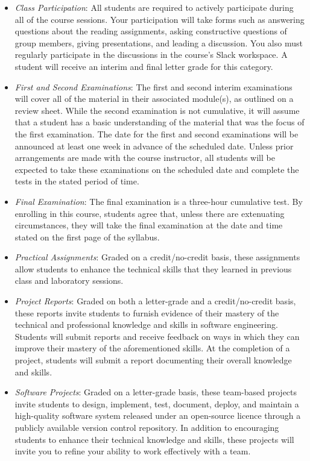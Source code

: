 \documentclass[11pt]{article}
\begin{document}
\begin{itemize}

  \item {\em Class Participation\/}: All students are required to actively
    participate during all of the course sessions. Your participation will take
    forms such as answering questions about the reading assignments, asking
    constructive questions of group members, giving presentations, and leading a
    discussion. You also must regularly participate in the discussions in the
    course's Slack workspace. A student will receive an interim and final letter
    grade for this category.

  \item {\em First and Second Examinations\/}: The first and second interim
    examinations will cover all of the material in their associated module(s),
    as outlined on a review sheet. While the second examination is not
    cumulative, it will assume that a student has a basic understanding of the
    material that was the focus of the first examination. The date for the first
    and second examinations will be announced at least one week in advance of
    the scheduled date. Unless prior arrangements are made with the course
    instructor, all students will be expected to take these examinations on the
    scheduled date and complete the tests in the stated period of time.

  \item {\em Final Examination\/}: The final examination is a three-hour
    cumulative test. By enrolling in this course, students agree that, unless
    there are extenuating circumstances, they will take the final examination at
    the date and time stated on the first page of the syllabus.

  \item {\em Practical Assignments\/}: Graded on a credit/no-credit basis, these
    assignments allow students to enhance the technical skills that they learned
    in previous class and laboratory sessions.

  \item {\em Project Reports\/}: Graded on both a letter-grade and a
    credit/no-credit basis, these reports invite students to furnish evidence of
    their mastery of the technical and professional knowledge and skills in
    software engineering. Students will submit reports and receive feedback on
    ways in which they can improve their mastery of the aforementioned skills.
    At the completion of a project, students will submit a report documenting
    their overall knowledge and skills.

  \item {\em Software Projects\/}: Graded on a letter-grade basis, these
    team-based projects invite students to design, implement, test, document,
    deploy, and maintain a high-quality software system released under an
    open-source licence through a publicly available version control repository.
    In addition to encouraging students to enhance their technical knowledge and
    skills, these projects will invite you to refine your ability to work
    effectively with a team.

\end{itemize}
\end{document}
